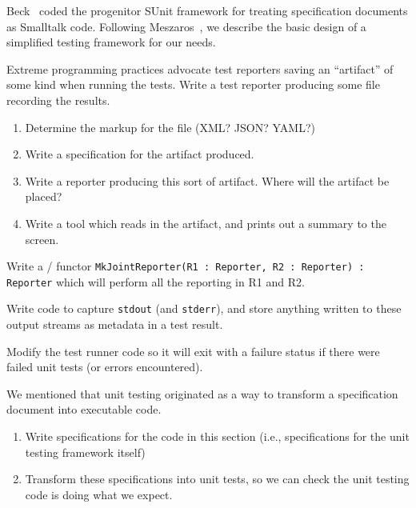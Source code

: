 \begin{node}[References]
Beck~\cite{beck1994simple} coded the progenitor SUnit framework for
treating specification documents as Smalltalk code.
Following Meszaros~\cite{meszaros2007xunit}, we describe the basic
design of a simplified testing framework for our needs.
\end{node}

\begin{xca}
Extreme programming practices advocate test reporters saving an
``artifact'' of some kind when running the tests. Write a test
reporter producing some file recording the results.
\begin{enumerate}
\item Determine the markup for the file (XML? JSON? YAML?)
\item Write a specification for the artifact produced. 
\item Write a reporter producing this sort of artifact. Where will the artifact be placed? 
\item Write a tool which reads in the artifact, and prints out a summary to the screen. 
\end{enumerate}
\end{xca}

\begin{xca}
Write a \SML/ functor \texttt{MkJointReporter(R1 : Reporter, R2 : Reporter) : Reporter}
which will perform all the reporting in {\Tt{}R1\nwendquote} and {\Tt{}R2\nwendquote}.
\end{xca}

\begin{xca}
Write code to capture \texttt{stdout} (and \texttt{stderr}), and store
anything written to these output streams as metadata in a test result.
\end{xca}

\begin{xca}
Modify the test runner code so it will exit with a failure status if
there were failed unit tests (or errors encountered).
\end{xca}

\begin{xca}
We mentioned that unit testing originated as a way to transform a
specification document into executable code.
\begin{enumerate}
\item Write specifications for the code in this section (i.e.,
  specifications for the unit testing framework itself)
\item Transform these specifications into unit tests, so we can check
  the unit testing code is doing what we expect.
\end{enumerate}
\end{xca}

